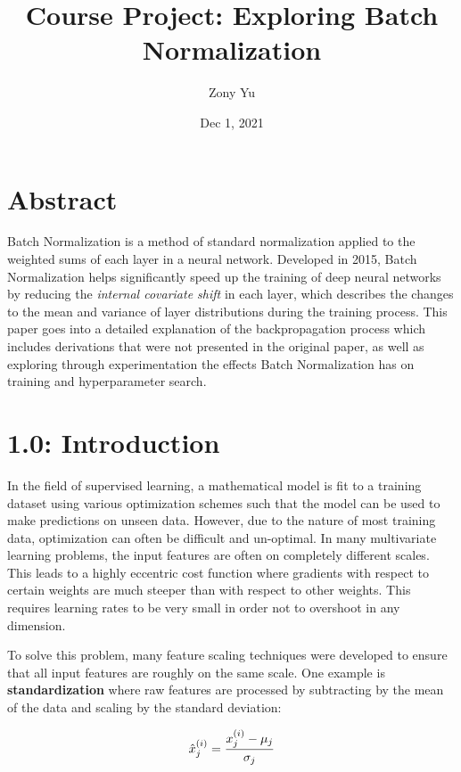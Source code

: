 \documentclass{article}
\title{Course Project: Exploring Batch Normalization}
\author{Zony Yu}
\date{Dec 1, 2021}
\begin{document}
\maketitle

\begin{multicols}{2}






\section*{Abstract}

Batch Normalization is a method of standard normalization applied to the 
weighted sums of each layer in a neural network. Developed in 2015, Batch Normalization
helps significantly speed up the training of deep neural networks by reducing the 
\textit{internal covariate shift} in each layer, which describes the 
changes to the mean and variance of layer distributions during the training process. This
paper goes into a detailed explanation of the backpropagation process which includes
derivations that were not presented in the original paper, as well as exploring through 
experimentation the effects Batch Normalization has on training and hyperparameter search.


\section*{1.0: Introduction}
In the field of supervised learning, a mathematical model is fit to 
a training dataset using various optimization schemes such that the model 
can be used to make predictions on unseen data. However, 
due to the nature of most training data, optimization can often be
difficult and un-optimal. In many multivariate learning problems, the input features are
often on completely different scales. This leads to a highly eccentric cost
function where gradients with respect to certain weights are much steeper
than with respect to other weights. This requires learning rates to 
be very small in order not to overshoot in any dimension.

To solve this problem, many feature scaling techniques were developed to ensure
that all input features are roughly on the same scale. One example is \textbf{standardization}\cite{standardization}
where raw features are processed by subtracting by the mean of the data and 
scaling by the standard deviation:

\begin{equation}
    \hat{x}_j^{(i)} = {x^{(i)}_j - \mu_j \over \sigma_j} \notag
\end{equation}


\end{multicols}
\end{document}
